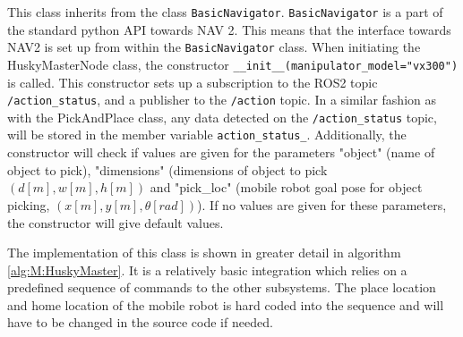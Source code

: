 

%


This class inherits from the class \lstinline{BasicNavigator}. \lstinline{BasicNavigator} is a part of the standard python API towards NAV 2. This means that the interface towards NAV2 is set up from within the \lstinline{BasicNavigator} class. When initiating the HuskyMasterNode class, the constructor \lstinline{__init__(manipulator_model="vx300")} is called. This constructor sets up a subscription to the ROS2 topic \lstinline{/action_status}, and a publisher to the \lstinline{/action} topic. In a similar fashion as with the PickAndPlace class, any data detected on the \lstinline{/action_status} topic, will be stored in the member variable \lstinline{action_status_}. Additionally, the constructor will check if values are given for the parameters "object" (name of object to pick), "dimensions" (dimensions of object to pick $(d[m], w[m], h[m])$ and "pick\_loc" (mobile robot goal pose for object picking, $(x[m], y[m], \theta[rad])$). If no values are given for these parameters, the constructor will give default values. 

The implementation of this class is shown in greater detail in algorithm \ref{alg:M:HuskyMaster}. It is a relatively basic integration which relies on a predefined sequence of commands to the other subsystems. The place location and home location of the mobile robot is hard coded into the sequence and will have to be changed in the source code if needed.



